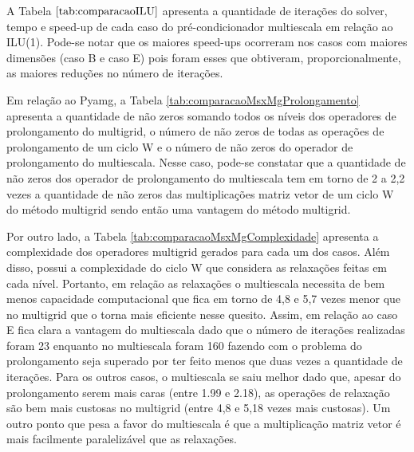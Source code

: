 A Tabela $\ref{tab:comparacaoILU}$ apresenta a quantidade de iterações do solver, tempo e speed-up de cada caso do pré-condicionador multiescala em relação ao ILU(1). Pode-se notar que os maiores speed-ups ocorreram nos casos com maiores dimensões (caso B e caso E) pois foram esses que obtiveram, proporcionalmente, as maiores reduções no número de iterações.

Em relação ao Pyamg, a Tabela \ref{tab:comparacaoMsxMgProlongamento} apresenta a quantidade de não zeros somando todos os níveis dos operadores de prolongamento do multigrid, o número de não zeros de todas as operações de prolongamento de um ciclo W e o número de não zeros do operador de prolongamento do multiescala. Nesse caso, pode-se constatar que a quantidade de não zeros dos operador de prolongamento do multiescala tem em torno de 2 a 2,2 vezes a quantidade de não zeros das multiplicações matriz vetor de um ciclo W do método multigrid sendo então uma vantagem do método multigrid.

Por outro lado, a Tabela \ref{tab:comparacaoMsxMgComplexidade} apresenta a complexidade dos operadores multigrid gerados para cada um dos casos. Além disso, possui a complexidade do ciclo W que considera as relaxações feitas em cada nível. Portanto, em relação as relaxações o multiescala necessita de bem menos capacidade computacional que fica em torno de 4,8 e 5,7 vezes menor que no multigrid que o torna mais eficiente nesse quesito. 
Assim, em relação ao caso E fica clara a vantagem do multiescala dado que o número de iterações realizadas foram 23 enquanto no multiescala foram 160 fazendo com o problema do prolongamento seja superado por ter feito menos que duas vezes a quantidade de iterações. Para os outros casos, o multiescala se saiu melhor dado que, apesar do prolongamento serem mais caras (entre 1.99 e 2.18), as operações de relaxação são bem mais custosas no multigrid (entre 4,8 e 5,18 vezes mais custosas). Um outro ponto que pesa a favor do multiescala é que a multiplicação matriz vetor é mais facilmente paralelizável que as relaxações.

